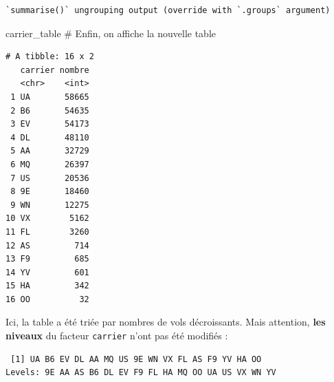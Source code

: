 \documentclass[
  a4paper,
]{article}
\newenvironment{Shaded}{\begin{snugshade}}{\end{snugshade}}
\newcommand{\CommentTok}[1]{\textcolor[rgb]{0.54,0.53,0.53}{#1}}
\newcommand{\DataTypeTok}[1]{\textcolor[rgb]{0.00,0.34,0.68}{#1}}
\newcommand{\KeywordTok}[1]{\textcolor[rgb]{0.12,0.11,0.11}{\textbf{#1}}}
\newcommand{\NormalTok}[1]{\textcolor[rgb]{0.12,0.11,0.11}{#1}}
\newcommand{\OperatorTok}[1]{\textcolor[rgb]{0.12,0.11,0.11}{#1}}
\newcommand{\StringTok}[1]{\textcolor[rgb]{0.75,0.01,0.01}{#1}}
\begin{document}
\begin{Shaded}
\end{Shaded}

\begin{verbatim}
`summarise()` ungrouping output (override with `.groups` argument)
\end{verbatim}

\begin{Shaded}
\begin{Highlighting}[]
\NormalTok{carrier_table                  }\CommentTok{# Enfin, on affiche la nouvelle table}
\end{Highlighting}
\end{Shaded}

\begin{verbatim}
# A tibble: 16 x 2
   carrier nombre
   <chr>    <int>
 1 UA       58665
 2 B6       54635
 3 EV       54173
 4 DL       48110
 5 AA       32729
 6 MQ       26397
 7 US       20536
 8 9E       18460
 9 WN       12275
10 VX        5162
11 FL        3260
12 AS         714
13 F9         685
14 YV         601
15 HA         342
16 OO          32
\end{verbatim}

Ici, la table a été triée par nombres de vols décroissants. Mais attention, \textbf{les niveaux} du facteur \texttt{carrier} n'ont pas été modifiés :

\begin{Shaded}
\end{Shaded}

\begin{verbatim}
 [1] UA B6 EV DL AA MQ US 9E WN VX FL AS F9 YV HA OO
Levels: 9E AA AS B6 DL EV F9 FL HA MQ OO UA US VX WN YV
\end{verbatim}
\end{document}
